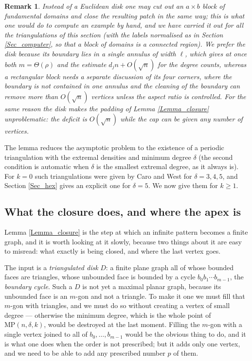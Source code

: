 \documentclass[10pt,a4paper]{article}
\newtheorem{remark}[theorem]{Remark}
\begin{document}
\begin{remark}
\label{Rem_patch}Instead of a Euclidean disk one may cut out an $a\times b$ block of fundamental domains and close the
resulting patch in the same way; this is what one would do to compute an example by hand, and we have carried it out
for all the triangulations of this section (with the labels normalised as in Section \ref{Sec_computer}, so that a block
of domains is a connected region). We prefer the disk because its boundary lies in a single annulus of width
$\ell $, which gives at once both $m=\Theta (\rho )$ and the estimate $d_{j}n+O(\sqrt{n})$ for the degree counts,
whereas a rectangular block needs a separate discussion of its four corners, where the boundary is not contained in
one annulus and the cleaning of the boundary can remove more than $O(\sqrt{n})$ vertices unless the aspect ratio is
controlled. For the same reason the disk makes the padding of Lemma \ref{Lemma_closure} unproblematic: the deficit is
$O(\sqrt{n})$ while the cap can be given any number of vertices.
\end{remark}

The lemma reduces the asymptotic problem to the existence of a periodic triangulation with the extremal densities
and minimum degree $\delta $ (the second condition is automatic when $\delta $ is the smallest extremal degree, as it
always is). For $k=0$ such triangulations were given by Caro and West \cite[Theorem 2.5]{CaroWest} for
$\delta =3,4,5$, and Section \ref{Sec_hex} gives an explicit one for $\delta =5$. We now give them for $k\geq 1$.

\subsection{What the closure does, and where the apex is}
\label{Sec_apex}

Lemma \ref{Lemma_closure} is the step at which an infinite pattern becomes a finite graph, and it is worth
looking at it slowly, because two things about it are easy to misread: what exactly is being closed, and where
the last vertex goes.

The input is a \emph{triangulated disk} $D$: a finite plane graph all of whose bounded faces are triangles,
whose unbounded face is bounded by a cycle $b_{0}b_{1}\cdots b_{m-1}$, the \emph{boundary cycle}. Such a $D$ is
not yet a maximal planar graph, because its unbounded face is an $m$-gon and not a triangle. To make it
one we must fill that $m$-gon with triangles, and we must do so without creating a vertex of small degree ---
otherwise the minimum degree, which is the whole point of $\mathrm{MP}(n,\delta ,k)$, would be destroyed at the
last moment. Filling the $m$-gon with a single vertex joined to all of $b_{0},\ldots ,b_{m-1}$ would be the
obvious thing to do, and it is what one does when the order is not prescribed; but it adds only one vertex, and
we need to be able to add any prescribed number $p$ of them.
\end{document}
